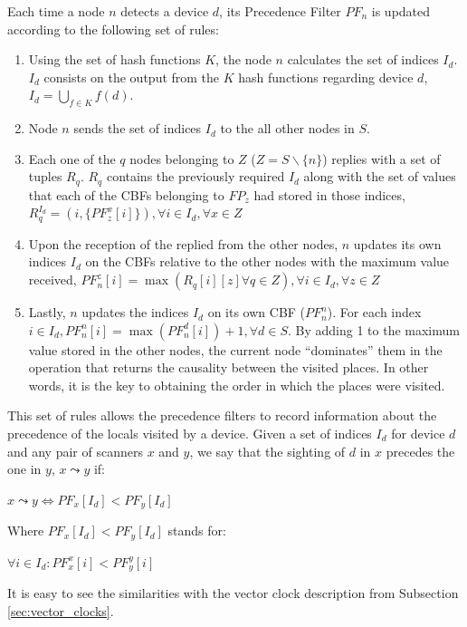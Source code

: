 Each time a node $n$ detects a device $d$, its Precedence Filter
$PF_n$ is updated according to the following set of rules:
\begin{enumerate}
\item Using the set of hash functions $K$, the node $n$ calculates the
  set of indices $I_d$. $I_d$ consists on the output from the $K$ hash
  functions regarding device $d$, $I_d=\bigcup_{f \in K} f(d)$.
\item Node $n$ sends the set of indices $I_d$ to the all other nodes
  in $S$.
\item Each one of the $q$ nodes belonging to $Z$ ($Z = S \backslash
  \{n\}$) replies with a set of tuples $R_q$. $R_q$ contains
  the previously required $I_d$ along with the set of values that each
  of the CBFs belonging to $FP_z$ had stored in those indices,
  $R_q^{I_d}= (i,\{PF_z^x[i]\}) ,\forall i \in I_d, \forall x \in Z$
\item Upon the reception of the replied from the other nodes, $n$
  updates its own indices $I_d$ on the CBFs relative to the other
  nodes with the maximum value received, $PF_n^z[i] = \max(R_q[i][z] \forall
  q \in Z), \forall i \in I_d, \forall z \in Z$
\item Lastly, $n$ updates the indices $I_d$ on its own CBF
  ($PF_n^n$). For each index $i \in I_d, PF_n^n[i] = \max(PF_n^d[i])+1,
  \forall d \in S$. By adding 1 to the maximum value stored in the
  other nodes, the current node ``dominates'' them in the operation
  that returns the causality between the visited places. In other
  words, it is the key to obtaining the order in which the places were
  visited. 
\end{enumerate}

This set of rules allows the precedence filters to record information
about the precedence of the locals visited by a device. Given a set of
indices $I_d$ for device $d$ and any pair of scanners $x$ and $y$, we
say that the sighting of $d$ in $x$ precedes the one in $y$, $x
\leadsto y$ if: 

\begin{center}
\begin{math}
	x\leadsto y \Longleftrightarrow PF_{x}[I_d] < PF_{y}[I_d]
\end{math}
\end{center}
Where $PF_x[I_d] < PF_y[I_d]$ stands for:
\begin{center}
  \begin{math}
    \forall i \in I_d : PF_x^x[i] < PF_y^y[i]
  \end{math}

\end{center}
It is easy to see the similarities with the vector clock description
from Subsection \ref{sec:vector_clocks}. 

